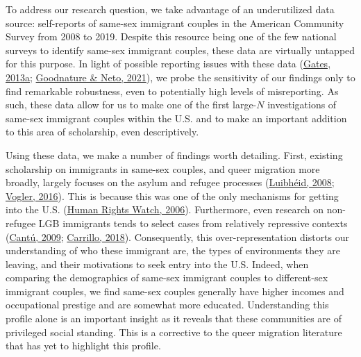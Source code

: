 \documentclass[
  11pt,
]{article}
\begin{document}
To address our research question, we take advantage of an underutilized data source: self-reports of same-sex immigrant couples in the American Community Survey from 2008 to 2019. Despite this resource being one of the few national surveys to identify same-sex immigrant couples, these data are virtually untapped for this purpose. In light of possible reporting issues with these data (\protect\hyperlink{ref-gates_2013}{Gates, 2013a}; \protect\hyperlink{ref-goodnature_2021}{Goodnature \& Neto, 2021}), we probe the sensitivity of our findings only to find remarkable robustness, even to potentially high levels of misreporting. As such, these data allow for us to make one of the first large-\(N\) investigations of same-sex immigrant couples within the U.S. and to make an important addition to this area of scholarship, even descriptively.

Using these data, we make a number of findings worth detailing. First, existing scholarship on immigrants in same-sex couples, and queer migration more broadly, largely focuses on the asylum and refugee processes (\protect\hyperlink{ref-luibheid_2008}{Luibhéid, 2008}; \protect\hyperlink{ref-vogler_2016}{Vogler, 2016}). This is because this was one of the only mechanisms for getting into the U.S. (\protect\hyperlink{ref-humanrightswatch_2006}{Human Rights Watch, 2006}). Furthermore, even research on non-refugee LGB immigrants tends to select cases from relatively repressive contexts (\protect\hyperlink{ref-cantu_2009}{Cantú, 2009}; \protect\hyperlink{ref-carrillo_2018}{Carrillo, 2018}). Consequently, this over-representation distorts our understanding of who these immigrant are, the types of environments they are leaving, and their motivations to seek entry into the U.S. Indeed, when comparing the demographics of same-sex immigrant couples to different-sex immigrant couples, we find same-sex couples generally have higher incomes and occupational prestige and are somewhat more educated. Understanding this profile alone is an important insight as it reveals that these communities are of privileged social standing. This is a corrective to the queer migration literature that has yet to highlight this profile.
\end{document}
